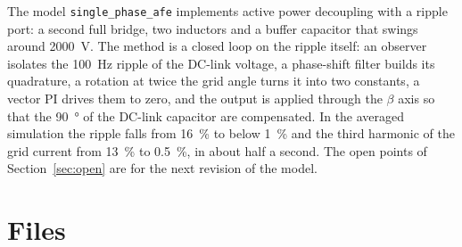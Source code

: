 \documentclass[11pt,a4paper]{scrartcl}
\newcommand{\code}[1]{\texttt{#1}}
\begin{document}
\begin{onehalfspace}
The model \code{single\_phase\_afe} implements active power decoupling with a ripple port: a second full bridge, two inductors and a buffer capacitor that swings around \SI{2000}{\volt}. The method is a closed loop on the ripple itself: an observer isolates the \SI{100}{\hertz} ripple of the DC-link voltage, a phase-shift filter builds its quadrature, a rotation at twice the grid angle turns it into two constants, a vector PI drives them to zero, and the output is applied through the $\beta$ axis so that the \SI{90}{\degree} of the DC-link capacitor are compensated. In the averaged simulation the ripple falls from \SI{16}{\percent} to below \SI{1}{\percent} and the third harmonic of the grid current from \SI{13}{\percent} to \SI{0.5}{\percent}, in about half a second. The open points of Section~\ref{sec:open} are for the next revision of the model.

\section{Files}
\label{sec:files}


\end{onehalfspace}
\end{document}
